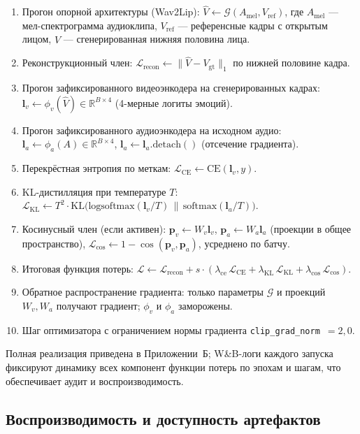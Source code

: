 \documentclass[a4paper, 12pt, oneside, openany]{article}
\begin{document}
\begin{enumerate}
\item Прогон опорной архитектуры (Wav2Lip): $\hat{V} \leftarrow \mathcal{G}(A_{\text{mel}}, V_{\text{ref}})$, где $A_{\text{mel}}$ --- мел-спектрограмма аудиоклипа, $V_{\text{ref}}$ --- референсные кадры с открытым лицом, $\hat{V}$ --- сгенерированная нижняя половина лица.
\item Реконструкционный член: $\mathcal{L}_{\text{recon}} \leftarrow \|\hat{V} - V_{\text{gt}}\|_1$ по нижней половине кадра.
\item Прогон зафиксированного видеоэнкодера на сгенерированных кадрах: $\mathbf{l}_v \leftarrow \phi_v(\hat{V}) \in \mathbb{R}^{B \times 4}$ (4-мерные логиты эмоций).
\item Прогон зафиксированного аудиоэнкодера на исходном аудио: $\mathbf{l}_a \leftarrow \phi_a(A) \in \mathbb{R}^{B \times 4}$, $\mathbf{l}_a \leftarrow \mathbf{l}_a.\mathrm{detach}()$ (отсечение градиента).
\item Перекрёстная энтропия по меткам: $\mathcal{L}_{\text{CE}} \leftarrow \mathrm{CE}(\mathbf{l}_v, y)$.
\item KL-дистилляция при температуре $T$: $\mathcal{L}_{\text{KL}} \leftarrow T^2 \cdot \mathrm{KL}\bigl(\mathrm{logsoftmax}(\mathbf{l}_v / T)\,\|\,\mathrm{softmax}(\mathbf{l}_a / T)\bigr)$.
\item Косинусный член (если активен): $\mathbf{p}_v \leftarrow W_v \mathbf{l}_v$, $\mathbf{p}_a \leftarrow W_a \mathbf{l}_a$ (проекции в общее пространство), $\mathcal{L}_{\cos} \leftarrow 1 - \cos(\mathbf{p}_v, \mathbf{p}_a)$, усреднено по батчу.
\item Итоговая функция потерь: $\mathcal{L} \leftarrow \mathcal{L}_{\text{recon}} + s \cdot (\lambda_{\text{ce}}\,\mathcal{L}_{\text{CE}} + \lambda_{\text{KL}}\,\mathcal{L}_{\text{KL}} + \lambda_{\cos}\,\mathcal{L}_{\cos})$.
\item Обратное распространение градиента: только параметры $\mathcal{G}$ и проекций $W_v, W_a$ получают градиент; $\phi_v$ и $\phi_a$ заморожены.
\item Шаг оптимизатора с ограничением нормы градиента \texttt{clip\_grad\_norm}~$=2{,}0$.
\end{enumerate}

Полная реализация приведена в Приложении~Б; W\&B-логи каждого запуска фиксируют динамику всех компонент функции потерь по эпохам и шагам, что обеспечивает аудит и воспроизводимость.

\subsection{Воспроизводимость и доступность артефактов}
\end{document}
